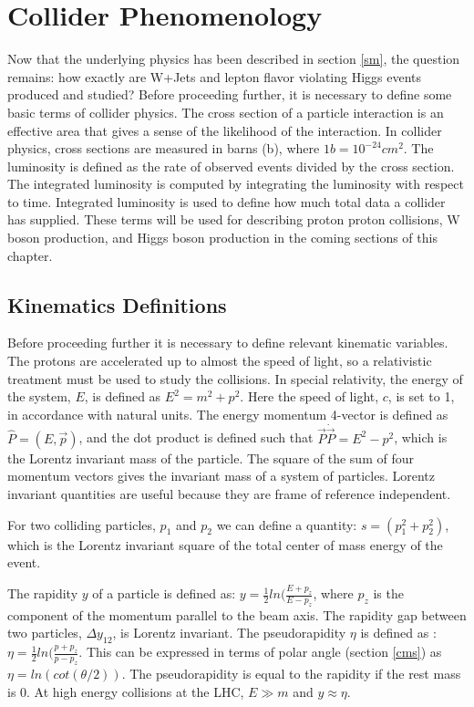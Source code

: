 \documentclass[oneside, letterpaper, oldfontcommands]{memoir}
\begin{document}
\chapter{Collider Phenomenology}\label{pheno}
Now that the underlying physics has been described in section \ref{sm}, the question remains: how exactly are W+Jets and lepton flavor violating Higgs events produced and studied? Before proceeding further, it is necessary to define some basic terms of collider physics. The cross section of a particle interaction is an effective area that gives a sense of the likelihood of the interaction. In collider physics, cross sections are measured in barns (b), where $1b = 10^{-24}cm^{2}$. The luminosity is defined as the rate of observed events divided by the cross section. The integrated luminosity is computed by integrating the luminosity with respect to time. Integrated luminosity is used to define how much total data a collider has supplied. These terms will be used for describing proton proton collisions, W boson production, and Higgs boson production in the coming sections of this chapter.

\section{Kinematics Definitions}\label{kindef}
\qquad Before proceeding further it is necessary to define relevant kinematic variables. The protons are accelerated up to almost the speed of light, so a relativistic treatment must be used to study the collisions.   In special relativity, the energy of the system, $E$, is defined as $E^{2} = m^{2}+p^{2}$. Here the speed of light, $c$, is set to 1, in accordance with natural units. The energy momentum 4-vector is defined as $ \hat{P} = (E, \vec{p})$, and the dot product is defined such that $\vec{P} \dot \vec{P} = E^{2}-p^{2}$, which is the Lorentz invariant mass of the particle. The square of the sum of four momentum vectors gives the invariant mass of a system of particles. Lorentz invariant quantities are useful because they are frame of reference independent. 

\qquad For two colliding particles, $p_{1}$ and $p_{2}$ we can define a quantity: $s = (p_{1}^2+p_{2}^2)$, which is the Lorentz invariant square of the total center of mass energy of the event.

\qquad The rapidity $y$ of a particle is defined as: $y = \frac{1}{2}ln(\frac{E+p_{z}}{E-p_{z}}$, where $p_{z}$ is the component of the momentum parallel to the beam axis. The rapidity gap between two particles, $\Delta y_{12}$, is Lorentz invariant. The pseudorapidity $\eta$ is defined as : $\eta = \frac{1}{2}ln(\frac{p+p_{z}}{p-p_{z}}$. This can be expressed in terms of polar angle (section \ref{cms}) as $\eta = ln(cot(\theta /2))$. The pseudorapidity is equal to the rapidity if the rest mass is 0. At high energy collisions at the LHC, $E \gg m$ and $y \approx \eta$.
\end{document}

